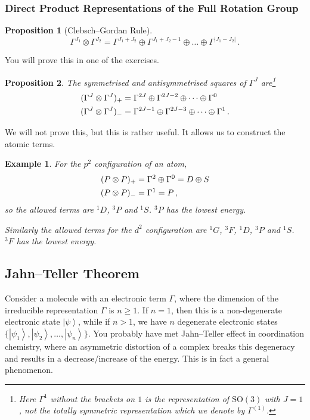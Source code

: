 \documentclass{article}
\theoremstyle{plain}\theoremheaderfont{\normalfont\itshape}\theorembodyfont{\rmfamily}\theoremseparator{.}\newtheorem*{rem}{Remark}\newtheorem*{ex}{Example}\newtheorem*{proof}{Proof}\newtheorem*{altp}{Alternative proof}
\theoremstyle{plain}\theoremheaderfont{\normalfont\bfseries}\theorembodyfont{\rmfamily}\theoremseparator{.}\newtheorem{thm}{Theorem}[section]\newtheorem{lem}[thm]{Lemma}\newtheorem{prop}[thm]{Proposition}\newtheorem*{cor}{Corollary}\newtheorem{defn}[thm]{Definition}\newtheorem{clm}[thm]{Claim}\newtheorem{clminproof}{Claim}\newtheorem*{law}{Law}\newtheorem{pos}[thm]{Postulate}
\theoremstyle{break}\theoremheaderfont{\normalfont\itshape}\theorembodyfont{\rmfamily}\theoremseparator{.\medskip}\newtheorem*{proofskip}{Proof}\newtheorem*{exs}{Examples}\newtheorem*{rems}{Remarks}
\theoremstyle{break}\theoremheaderfont{\normalfont\bfseries}\theorembodyfont{\rmfamily}\theoremseparator{.\medskip}\newtheorem{lemskip}[thm]{Lemma}\newtheorem{defnskip}[thm]{Definition}\newtheorem{propskip}[thm]{Proposition}\newtheorem{thmskip}[thm]{Theorem}
\numberwithin{equation}{section}
\newcommand{\ket}[1]{\left| #1 \right\rangle}
\newcommand{\abs}[1]{\left| #1 \right|}
\newcommand{\SO}{\mathrm{SO}}
\begin{document}
    \subsubsection{Direct Product Representations of the Full Rotation Group}
    \begin{prop}[Clebsch--Gordan Rule]
        \begin{equation}
            \Gamma^{J_1}\otimes\Gamma^{J_2}=\Gamma^{J_1+J_2}\oplus\Gamma^{J_1+J_2-1}\oplus\dots\oplus\Gamma^{\abs{J_1-J_2}}\,.
        \end{equation}
    \end{prop}
    You will prove this in one of the exercises.

    \begin{prop}
        The symmetrised and antisymmetrised squares of \(\Gamma^{J}\) are\footnote{Here \(\Gamma^{1}\) without the brackets on \(1\) is the representation of \(\SO(3)\) with \(J=1\), not the totally symmetric representation which we denote by \(\Gamma^{(1)}\).}
        \begin{align}
            (\Gamma^{J}\otimes\Gamma^{J})_+&=\Gamma^{2J}\oplus\Gamma^{2J-2}\oplus\dots\oplus\Gamma^{0}\notag\\
            (\Gamma^{J}\otimes\Gamma^{J})_-&=\Gamma^{2J-1}\oplus\Gamma^{2J-3}\oplus\dots\oplus\Gamma^{1}\,.
        \end{align}
    \end{prop}
    We will not prove this, but this is rather useful. It allows us to construct the atomic terms.
    \begin{ex}
        For the \(p^2\) configuration of an atom,
        \begin{align}
            (P\otimes P)_+&=\Gamma^{2}\oplus\Gamma^{0}=D\oplus S\notag \\
            (P\otimes P)_-&=\Gamma^{1}=P\,,
        \end{align}
        so the allowed terms are \(^1D\), \(^3P\) and \(^1S\). \(^3P\) has the lowest energy.

        Similarly the allowed terms for the \(d^2\) configuration are \(^1G\), \(^3F\), \(^1D\), \(^3P\) and \(^1S\). \(^3F\) has the lowest energy.
    \end{ex}

    \subsection{Jahn--Teller Theorem}
    Consider a molecule with an electronic term \(\Gamma\), where the dimension of the irreducible representation \(\Gamma\) is \(n\ge 1\). If \(n=1\), then this is a non-degenerate electronic state \(\ket{\psi}\), while if \(n>1\), we have \(n\) degenerate electronic states \(\{\ket{\psi_1},\ket{\psi_2},\dots,\ket{\psi_n}\}\). You probably have met Jahn--Teller effect in coordination chemistry, where an asymmetric distortion of a complex breaks this degeneracy and results in a decrease/increase of the energy. This is in fact a general phenomenon.
    
\end{document}
